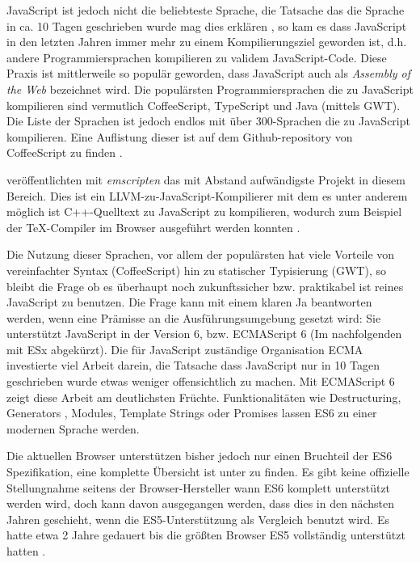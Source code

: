 \documentclass[12pt,twoside]{book}
\begin{document}
JavaScript ist jedoch nicht die beliebteste Sprache, die Tatsache das die Sprache in ca. 10 Tagen geschrieben wurde mag dies erklären \citep{severance2012javascript}, so kam es dass JavaScript in den letzten Jahren immer mehr zu einem Kompilierungsziel geworden ist, d.h. andere Programmiersprachen kompilieren zu validem JavaScript-Code. Diese Praxis ist mittlerweile so populär geworden, dass JavaScript auch als \textit{Assembly of the Web} \cite{webassembly} bezeichnet wird. Die populärsten Programmiersprachen die zu JavaScript kompilieren sind vermutlich CoffeeScript, TypeScript und Java (mittels GWT). Die Liste der Sprachen ist jedoch endlos mit über 300-Sprachen die zu JavaScript kompilieren. Eine Auflistung dieser ist auf dem Github-repository von CoffeeScript zu finden \cite{javascriptcompile}.

\citep{zakai2011emscripten} veröffentlichten mit \textit{emscripten} das mit Abstand aufwändigste Projekt in diesem Bereich. Dies ist ein LLVM-zu-JavaScript-Kompilierer mit dem es unter anderem möglich ist C++-Quelltext zu JavaScript zu kompilieren, wodurch zum Beispiel der TeX-Compiler im Browser ausgeführt werden konnten \cite{texlive}.

Die Nutzung dieser Sprachen, vor allem der populärsten hat viele Vorteile von vereinfachter Syntax (CoffeeScript) hin zu statischer Typisierung (GWT), so bleibt die Frage ob es überhaupt noch zukunftssicher bzw. praktikabel ist reines JavaScript zu benutzen.
Die Frage kann mit einem klaren Ja beantworten werden, wenn eine Prämisse an die Ausführungsumgebung gesetzt wird: Sie unterstützt JavaScript in der Version 6, bzw. ECMAScript 6 (Im nachfolgenden mit ESx abgekürzt).
Die für JavaScript zuständige Organisation ECMA investierte viel Arbeit darein, die Tatsache dass JavaScript nur in 10 Tagen geschrieben wurde etwas weniger offensichtlich zu machen. Mit ECMAScript 6 \cite{es6} zeigt diese Arbeit am deutlichsten Früchte. Funktionalitäten wie Destructuring, Generators , Modules, Template Strings oder Promises lassen ES6 zu einer modernen Sprache werden.

Die aktuellen Browser unterstützen bisher jedoch nur einen Bruchteil der ES6 Spezifikation, eine komplette Übersicht ist unter \cite{es6features} zu finden. Es gibt keine offizielle Stellungnahme seitens der Browser-Hersteller wann ES6 komplett unterstützt werden wird, doch kann davon ausgegangen werden, dass dies in den nächsten Jahren geschieht, wenn die ES5-Unterstützung als Vergleich benutzt wird. Es hatte etwa 2 Jahre gedauert bis die größten Browser ES5 vollständig unterstützt hatten \cite{es5adoption}.
\end{document}
